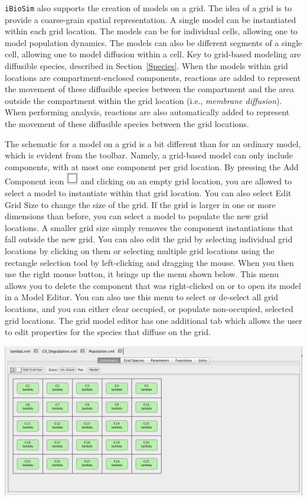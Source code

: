 \documentclass[titlepage,11pt]{article}
\begin{document}
\noindent
{\tt iBioSim} also supports the creation of models on a grid.  The idea of a grid is to provide a coarse-grain spatial representation.  A single model can be instantiated within each grid location.  The models can be for individual cells, allowing one to model population dynamics.  The models can also be different segments of a single cell, allowing one to model diffusion within a cell.  Key to grid-based modeling are diffusible species, described in Section~\ref{Species}.  When the models within grid locations are compartment-enclosed components, reactions are added to represent the movement of these diffusible species between the compartment and the area outside the compartment within the grid location (i.e., \emph{membrane diffusion}).  When performing analysis, reactions are also automatically added to represent the movement of these diffusible species between the grid locations.  

The schematic for a model on a grid is a bit different than for an ordinary model, which is evident from the toolbar.  Namely, a grid-based model can only include components, with at most one component per grid location.  By pressing the Add Component icon \includegraphics{../gui/icons/modelview/add_component_selected} and clicking on an empty grid location, you are allowed to select a model to instantiate within that grid location.  You can also select Edit Grid Size to change the size of the grid.  If the grid is larger in one or more dimensions than before, you can select a model to populate the new grid locations.  A smaller grid size simply removes the component instantiations that fall outside the new grid.  You can also edit the grid by selecting individual grid locations by clicking on them or selecting multiple grid locations using the rectangle selection tool by left-clicking and dragging the mouse.  When you then use the right mouse button, it brings up the menu shown below.  This menu allows you to delete the component that was right-clicked on or to open its model in a Model Editor.  You can also use this menu to select or de-select all grid locations, and you can either clear occupied, or populate non-occupied, selected grid locations.  The grid model editor has one additional tab which allows the user to edit properties for the species that diffuse on the grid.

\begin{center}
\includegraphics[width=160mm]{screenshots/gridModel}
\end{center}
\end{document}
